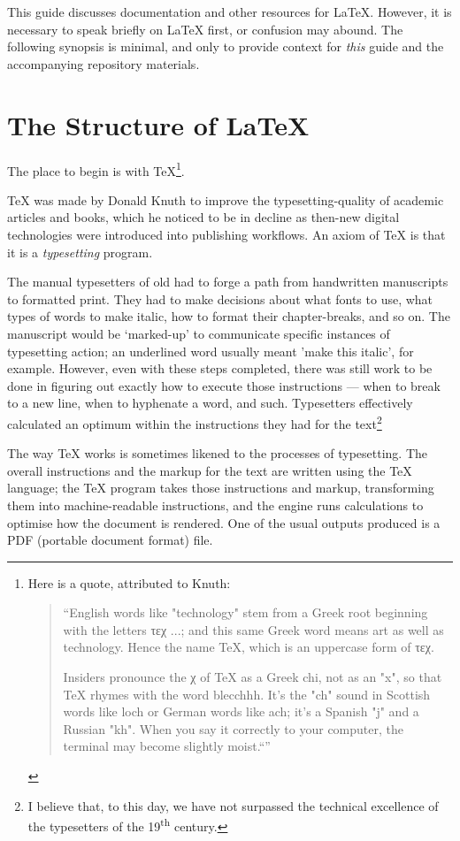 \documentclass[11pt, oneside]{memoir}
\begin{document}
This guide discusses documentation and other resources for LaTeX. However, it is necessary to speak briefly on LaTeX first, or confusion may abound. The following synopsis is minimal, and only to provide context for \emph{this} guide and the accompanying repository materials.
\newpage
\section{The Structure of \LaTeX{}}

The place to begin is with \TeX{}\footnote{Here is a quote, attributed to Knuth: \begin{quotation}``English words like "technology" stem from a Greek root beginning with the letters τεχ ...; and this same Greek word means art as well as technology. Hence the name TeX, which is an uppercase form of τεχ.

Insiders pronounce the χ of TeX as a Greek chi, not as an "x", so that TeX rhymes with the word blecchhh. It’s the "ch" sound in Scottish words like loch or German words like ach; it’s a Spanish "j" and a Russian "kh". When you say it correctly to your computer, the terminal may become slightly moist.``''\end{quotation}}.

TeX was made by Donald Knuth to improve the typesetting-quality of academic articles and books, which he noticed to be in decline as then-new digital technologies were introduced into publishing workflows. An axiom of \TeX{} is that it is a \emph{typesetting} program. 

The manual typesetters of old had to forge a path from handwritten manuscripts to formatted print. They had to make decisions about what fonts to use, what types of words to make italic, how to format their chapter-breaks, and so on. The manuscript would be `marked-up' to communicate specific instances of typesetting action; an underlined word usually meant 'make this italic', for example. However, even with these steps completed, there was still work to be done in figuring out exactly how to execute those instructions — when to break to a new line, when to hyphenate a word, and such. Typesetters effectively calculated an optimum within the instructions they had for the text\footnote{I believe that, to this day, we have not surpassed the technical excellence of the typesetters of the 19\textsuperscript{th} century.}

The way TeX works is sometimes likened to the processes of typesetting. The overall instructions and the markup for the text are written using the TeX language; the TeX program takes those instructions and markup, transforming them into machine-readable instructions, and the engine runs calculations to optimise how the document is rendered. One of the usual outputs produced is a PDF (portable document format) file.
\end{document}
